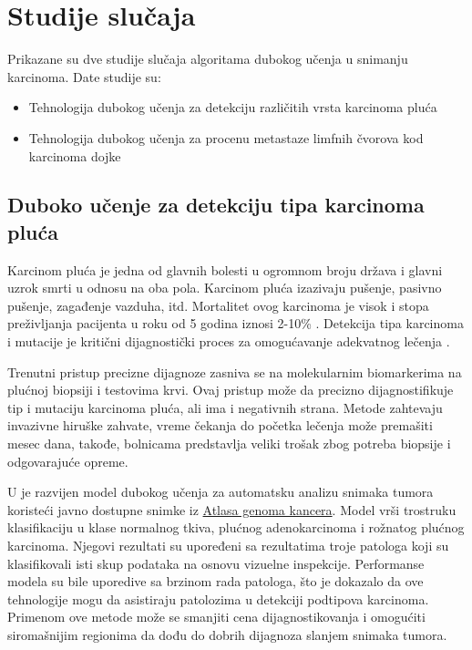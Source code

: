 \documentclass[a4paper]{article}
\begin{document}
\section{Studije slučaja}
\label{sec:naslov1} 

Prikazane su dve studije slučaja algoritama dubokog učenja u snimanju karcinoma. Date studije su:

\begin{itemize}
    \item Tehnologija dubokog učenja za detekciju različitih vrsta karcinoma pluća
    \item Tehnologija dubokog učenja za procenu metastaze limfnih čvorova kod karcinoma dojke
\end{itemize}

\subsection{Duboko učenje za detekciju tipa karcinoma pluća}
\label{subsec:podnaslov1}


Karcinom pluća je jedna od glavnih bolesti u ogromnom broju država i glavni uzrok smrti u odnosu na oba pola. Karcinom pluća izazivaju pušenje, pasivno pušenje, zagađenje vazduha, itd. Mortalitet ovog karcinoma je visok i stopa preživljanja pacijenta u roku od 5 godina iznosi 2-10\% \cite{bray}. Detekcija tipa karcinoma i mutacije je kritični dijagnostički proces za omogućavanje adekvatnog lečenja \cite{coccia}.

Trenutni pristup precizne dijagnoze zasniva se na molekularnim biomarkerima na plućnoj biopsiji i testovima krvi. Ovaj pristup može da precizno dijagnostifikuje tip i mutaciju karcinoma pluća, ali ima i negativnih strana. Metode zahtevaju invazivne hiruške zahvate, vreme čekanja do početka lečenja može premašiti mesec dana, takođe, bolnicama predstavlja veliki trošak zbog potreba biopsije i odgovarajuće opreme.

U \cite{coudray} je razvijen model dubokog učenja za automatsku analizu snimaka tumora koristeći javno dostupne snimke iz \href{https://www.cancer.gov/about-nci/organization/ccg/research/structural-genomics/tcga}{Atlasa genoma kancera}. Model vrši trostruku klasifikaciju u klase normalnog tkiva, plućnog adenokarcinoma i rožnatog plućnog karcinoma. Njegovi rezultati su upoređeni sa rezultatima troje patologa koji su klasifikovali isti skup podataka na osnovu vizuelne inspekcije. Performanse modela su bile uporedive sa  brzinom rada patologa, što je dokazalo da ove tehnologije mogu da asistiraju patolozima u detekciji podtipova karcinoma. Primenom ove metode može se smanjiti cena dijagnostikovanja i omogućiti siromašnijim regionima da dođu do dobrih dijagnoza slanjem snimaka tumora.
\end{document}
